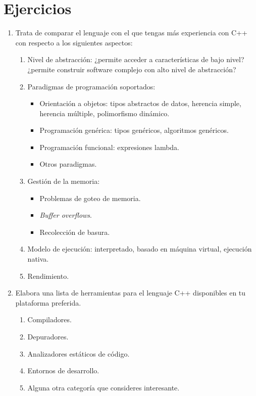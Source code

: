 \section{Ejercicios}

\begin{enumerate}

\item Trata de comparar el lenguaje con el que tengas más experiencia con C++ con
respecto a los siguientes aspectos:

\begin{enumerate}

  \item Nivel de abstracción: ¿permite acceder a características de bajo nivel?
              ¿permite construir software complejo con alto nivel de abstracción?

  \item Paradigmas de programación soportados:
    \begin{itemize}
      \item Orientación a objetos: tipos abstractos de datos, herencia simple,
            herencia múltiple, polimorfismo dinámico.
      \item Programación genérica: tipos genéricos, algoritmos genéricos.
      \item Programación funcional: expresiones lambda.
      \item Otros paradigmas.
    \end{itemize}

  \item Gestión de la memoria:
    \begin{itemize}
      \item Problemas de goteo de memoria.
      \item \emph{Buffer overflows}.
      \item Recolección de basura.
    \end{itemize}

  \item Modelo de ejecución: interpretado, basado en máquina virtual,
        ejecución nativa.

  \item Rendimiento.

\end{enumerate}

\item Elabora una lista de herramientas para el lenguaje C++ disponibles en tu
      plataforma preferida.
\begin{enumerate}
  \item Compiladores.
  \item Depuradores.
  \item Analizadores estáticos de código.
  \item Entornos de desarrollo.
  \item Alguna otra categoría que consideres interesante.
\end{enumerate}


\end{enumerate}
